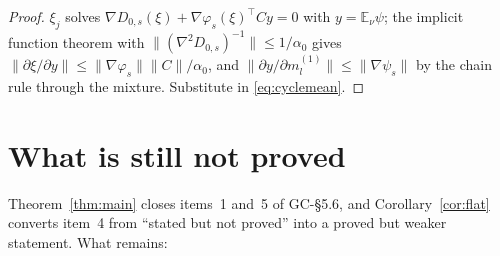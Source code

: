 \documentclass[11pt]{article}
\theoremstyle{definition}
\newcommand{\E}{\mathbb{E}}
\newcommand{\GC}[1]{\textsf{GC-#1}}
\begin{document}
\begin{proof}
$\xi_j$ solves $\nabla D_{0,s}(\xi) + \nabla\varphi_s(\xi)^\top C y = 0$ with
$y = \E_\nu\psi$; the implicit function theorem with
$\|(\nabla^2 D_{0,s})^{-1}\| \le 1/\alpha_0$ gives
$\|\partial\xi/\partial y\| \le \|\nabla\varphi_s\|\|C\|/\alpha_0$, and
$\|\partial y/\partial m^{(1)}_l\| \le \|\nabla\psi_s\|$ by the chain rule through
the mixture. Substitute in \eqref{eq:cyclemean}.
\end{proof}

\section{What is still not proved}\label{sec:remaining}

Theorem~\ref{thm:main} closes items~1 and~5 of \GC{\S5.6}, and
Corollary~\ref{cor:flat} converts item~4 from ``stated but not proved'' into a
proved but weaker statement. What remains:
\end{document}
